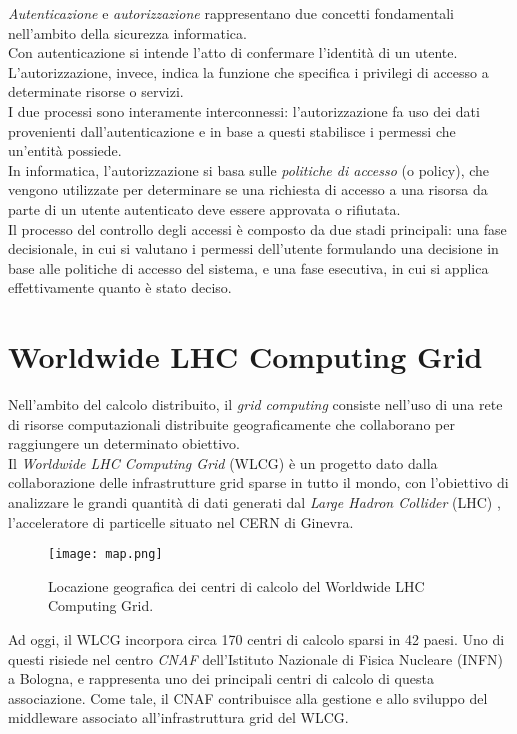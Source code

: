 \textit{Autenticazione} e \textit{autorizzazione} rappresentano due concetti fondamentali nell'ambito della
 sicurezza informatica.
 \\ Con autenticazione si intende l'atto di confermare l'identità di un utente. 
 L'autorizzazione, invece, indica la funzione che specifica i privilegi di accesso a determinate risorse o servizi.
\\I due processi sono interamente interconnessi: l'autorizzazione fa uso dei dati provenienti 
dall'autenticazione e in base a questi stabilisce i 
permessi che un'entità possiede.
\\In informatica, l'autorizzazione si basa sulle \textit{politiche di accesso} (o policy), che vengono utilizzate per determinare se 
una richiesta di accesso a una risorsa da parte di un utente autenticato deve essere approvata o rifiutata.
\\ Il processo del controllo degli accessi è composto da due stadi principali: una fase decisionale, in cui si valutano i permessi dell'utente 
 formulando una decisione in base alle politiche di accesso del sistema,
e una fase esecutiva, in cui si applica effettivamente quanto è stato deciso. 

\section{Worldwide LHC Computing Grid}
Nell'ambito del calcolo distribuito, il \textit{grid computing} consiste 
nell'uso di una rete di risorse computazionali distribuite geograficamente che collaborano 
per raggiungere un determinato obiettivo.
\\ Il \textit{Worldwide LHC Computing Grid} (WLCG) \cite{wlcg_doc} è un progetto dato dalla
 collaborazione 
delle infrastrutture grid sparse in tutto il mondo, con l'obiettivo
di analizzare le grandi quantità di dati generati dal \textit{Large Hadron Collider} (LHC) \cite{cern_lhc}, 
l'acceleratore di particelle situato nel CERN di Ginevra. 
\begin{figure}[h]
    \texttt{[image: map.png]}
    \centering
    \caption[Locazione geografica dei centri di calcolo del WLCG]{Locazione geografica dei centri di calcolo del Worldwide LHC Computing Grid.}
    \label{mappa}
\end{figure}

Ad oggi, il WLCG incorpora circa 170 centri di calcolo sparsi in 42 paesi. 
Uno di questi risiede nel centro \textit{CNAF} dell'Istituto Nazionale di Fisica Nucleare (INFN) \cite{infn_cnaf} a Bologna,
 e rappresenta uno dei principali centri di calcolo di questa associazione. Come tale, il CNAF contribuisce
  alla gestione e allo sviluppo del middleware associato all'infrastruttura grid del WLCG. 


